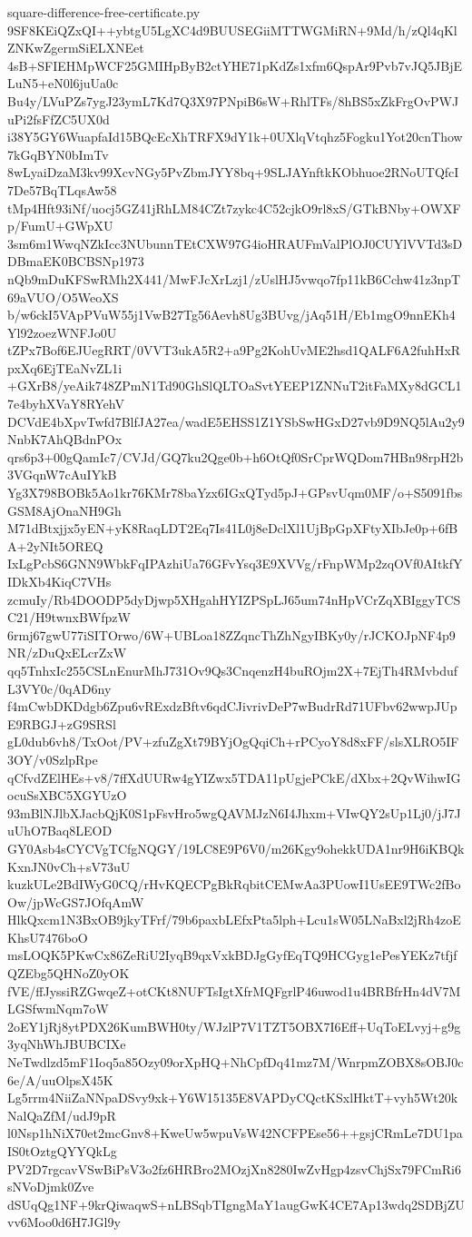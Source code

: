 \documentclass[11pt]{article}
\theoremstyle{definition}
\theoremstyle{remark}
\begin{document}
\begin{filecontents*}[overwrite]{square-difference-free-certificate.py}
9SF8KEiQZxQI++ybtgU5LgXC4d9BUUSEGiiMTTWGMiRN+9Md/h/zQl4qKlZNKwZgermSiELXNEet
4sB+SFIEHMpWCF25GMIHpByB2ctYHE71pKdZs1xfm6QspAr9Pvb7vJQ5JBjELuN5+eN0l6juUa0c
Bu4y/LVuPZs7ygJ23ymL7Kd7Q3X97PNpiB6sW+RhlTFs/8hBS5xZkFrgOvPWJuPi2fsFfZC5UX0d
i38Y5GY6WuapfaId15BQcEcXhTRFX9dY1k+0UXlqVtqhz5Fogku1Yot20cnThow7kGqBYN0bImTv
8wLyaiDzaM3kv99XcvNGy5PvZbmJYY8bq+9SLJAYnftkKObhuoe2RNoUTQfcI7De57BqTLqsAw58
tMp4Hft93iNf/uocj5GZ41jRhLM84CZt7zykc4C52cjkO9rl8xS/GTkBNby+OWXFp/FumU+GWpXU
3sm6m1WwqNZkIcc3NUbunnTEtCXW97G4ioHRAUFmValPlOJ0CUYlVVTd3sDDBmaEK0BCBSNp1973
nQb9mDuKFSwRMh2X441/MwFJcXrLzj1/zUslHJ5vwqo7fp11kB6Cchw41z3npT69aVUO/O5WeoXS
b/w6ckI5VApPVuW55j1VwB27Tg56Aevh8Ug3BUvg/jAq51H/Eb1mgO9nnEKh4Yl92zoezWNFJo0U
tZPx7Bof6EJUegRRT/0VVT3ukA5R2+a9Pg2KohUvME2hsd1QALF6A2fuhHxRpxXq6EjTEaNvZL1i
+GXrB8/yeAik748ZPmN1Td90GhSlQLTOaSvtYEEP1ZNNuT2itFaMXy8dGCL17e4byhXVaY8RYehV
DCVdE4bXpvTwfd7BlfJA27ea/wadE5EHSS1Z1YSbSwHGxD27vb9D9NQ5lAu2y9NnbK7AhQBdnPOx
qrs6p3+00gQamIc7/CVJd/GQ7ku2Qge0b+h6OtQf0SrCprWQDom7HBn98rpH2b3VGqnW7cAuIYkB
Yg3X798BOBk5Ao1kr76KMr78baYzx6IGxQTyd5pJ+GPsvUqm0MF/o+S5091fbsGSM8AjOnaNH9Gh
M71dBtxjjx5yEN+yK8RaqLDT2Eq7Is41L0j8eDclXl1UjBpGpXFtyXIbJe0p+6fBA+2yNIt5OREQ
IxLgPcbS6GNN9WbkFqIPAzhiUa76GFvYsq3E9XVVg/rFnpWMp2zqOVf0AItkfYIDkXb4KiqC7VHs
zcmuIy/Rb4DOODP5dyDjwp5XHgahHYIZPSpLJ65um74nHpVCrZqXBIggyTCSC21/H9twnxBWfpzW
6rmj67gwU77iSITOrwo/6W+UBLoa18ZZqncThZhNgyIBKy0y/rJCKOJpNF4p9NR/zDuQxELcrZxW
qq5TnhxIc255CSLnEnurMhJ731Ov9Qs3CnqenzH4buROjm2X+7EjTh4RMvbdufL3VY0c/0qAD6ny
f4mCwbDKDdgb6Zpu6vRExdzBftv6qdCJivrivDeP7wBudrRd71UFbv62wwpJUpE9RBGJ+zG9SRSl
gL0dub6vh8/TxOot/PV+zfuZgXt79BYjOgQqiCh+rPCyoY8d8xFF/slsXLRO5IF3OY/v0SzlpRpe
qCfvdZElHEs+v8/7ffXdUURw4gYIZwx5TDA11pUgjePCkE/dXbx+2QvWihwIGocuSsXBC5XGYUzO
93mBlNJlbXJacbQjK0S1pFsvHro5wgQAVMJzN6I4Jhxm+VIwQY2sUp1Lj0/jJ7JuUhO7Baq8LEOD
GY0Asb4sCYCVgTCfgNQGY/19LC8E9P6V0/m26Kgy9ohekkUDA1nr9H6iKBQkKxnJN0vCh+sV73uU
kuzkULe2BdIWyG0CQ/rHvKQECPgBkRqbitCEMwAa3PUowI1UsEE9TWc2fBoOw/jpWcGS7JOfqAmW
HlkQxcm1N3BxOB9jkyTFrf/79b6paxbLEfxPta5lph+Lcu1sW05LNaBxl2jRh4zoEKhsU7476boO
msLOQK5PKwCx86ZeRiU2IyqB9qxVxkBDJgGyfEqTQ9HCGyg1ePesYEKz7tfjfQZEbg5QHNoZ0yOK
fVE/ffJyssiRZGwqeZ+otCKt8NUFTsIgtXfrMQFgrlP46uwod1u4BRBfrHn4dV7MLGSfwmNqm7oW
2oEY1jRj8ytPDX26KumBWH0ty/WJzlP7V1TZT5OBX7I6Eff+UqToELvyj+g9g3yqNhWhJBUBCIXe
NeTwdlzd5mF1Ioq5a85Ozy09orXpHQ+NhCpfDq41mz7M/WnrpmZOBX8sOBJ0c6e/A/uuOlpsX45K
Lg5rrm4NiiZaNNpaDSvy9xk+Y6W15135E8VAPDyCQctKSxlHktT+vyh5Wt20kNalQaZfM/udJ9pR
l0Nsp1hNiX70et2mcGnv8+KweUw5wpuVsW42NCFPEse56++gsjCRmLe7DU1paIS0tOztgQYYQkLg
PV2D7rgcavVSwBiPsV3o2fz6HRBro2MOzjXn8280IwZvHgp4zsvChjSx79FCmRi6sNVoDjmk0Zve
dSUqQg1NF+9krQiwaqwS+nLBSqbTIgngMaY1augGwK4CE7Ap13wdq2SDBjZUvv6Moo0d6H7JGl9y

\end{filecontents*}
\end{document}
